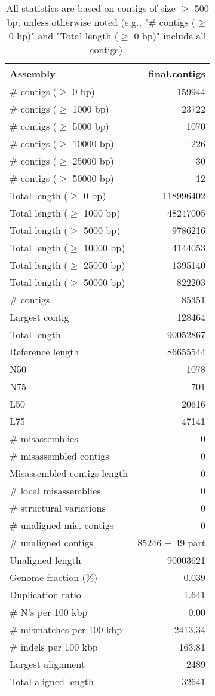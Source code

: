 \documentclass[12pt,a4paper]{article}
\begin{document}
\begin{table}[ht]
\begin{center}
\caption{All statistics are based on contigs of size $\geq$ 500 bp, unless otherwise noted (e.g., "\# contigs ($\geq$ 0 bp)" and "Total length ($\geq$ 0 bp)" include all contigs).}
\begin{tabular}{|l*{1}{|r}|}
\hline
Assembly & final.contigs \\ \hline
\# contigs ($\geq$ 0 bp) & 159944 \\ \hline
\# contigs ($\geq$ 1000 bp) & 23722 \\ \hline
\# contigs ($\geq$ 5000 bp) & 1070 \\ \hline
\# contigs ($\geq$ 10000 bp) & 226 \\ \hline
\# contigs ($\geq$ 25000 bp) & 30 \\ \hline
\# contigs ($\geq$ 50000 bp) & 12 \\ \hline
Total length ($\geq$ 0 bp) & 118996402 \\ \hline
Total length ($\geq$ 1000 bp) & 48247005 \\ \hline
Total length ($\geq$ 5000 bp) & 9786216 \\ \hline
Total length ($\geq$ 10000 bp) & 4144053 \\ \hline
Total length ($\geq$ 25000 bp) & 1395140 \\ \hline
Total length ($\geq$ 50000 bp) & 822203 \\ \hline
\# contigs & 85351 \\ \hline
Largest contig & 128464 \\ \hline
Total length & 90052867 \\ \hline
Reference length & 86655544 \\ \hline
N50 & 1078 \\ \hline
N75 & 701 \\ \hline
L50 & 20616 \\ \hline
L75 & 47141 \\ \hline
\# misassemblies & 0 \\ \hline
\# misassembled contigs & 0 \\ \hline
Misassembled contigs length & 0 \\ \hline
\# local misassemblies & 0 \\ \hline
\# structural variations & 0 \\ \hline
\# unaligned mis. contigs & 0 \\ \hline
\# unaligned contigs & 85246 + 49 part \\ \hline
Unaligned length & 90003621 \\ \hline
Genome fraction (\%) & 0.039 \\ \hline
Duplication ratio & 1.641 \\ \hline
\# N's per 100 kbp & 0.00 \\ \hline
\# mismatches per 100 kbp & 2413.34 \\ \hline
\# indels per 100 kbp & 163.81 \\ \hline
Largest alignment & 2489 \\ \hline
Total aligned length & 32641 \\ \hline
\end{tabular}
\end{center}
\end{table}
\end{document}
